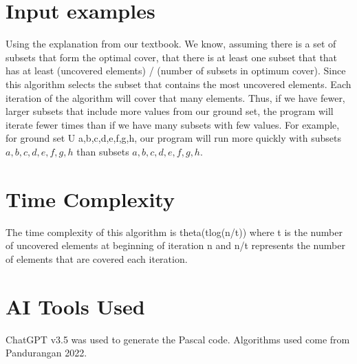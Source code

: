 \documentclass[conference]{IEEEtran}
\begin{document}
\section{Input examples}
Using the explanation from our textbook. We know, assuming there is a set of subsets that form the optimal cover, that there is at least one subset that that has at least (uncovered elements) / (number of subsets in optimum cover). Since this algorithm selects the subset that contains the most uncovered elements. Each iteration of the algorithm will cover that many elements. Thus, if we have fewer, larger subsets that include more values from our ground set, the program will iterate fewer times than if we have many subsets with few values. For example, for ground set U {a,b,c,d,e,f,g,h}, our program will run more quickly with subsets ${a,b,c,d}, {e,f,g,h}$ than subsets ${a}, {b}, {c}, {d}, {e}, {f}, {g}, {h}$.

\section{Time Complexity}
The time complexity of this algorithm is theta(tlog(n/t)) where t is the number of uncovered elements at beginning of iteration n and n/t represents the number of elements that are covered each iteration.

\section{AI Tools Used}
ChatGPT v3.5 was used to generate the Pascal code. Algorithms used come from Pandurangan 2022.
\end{document}

